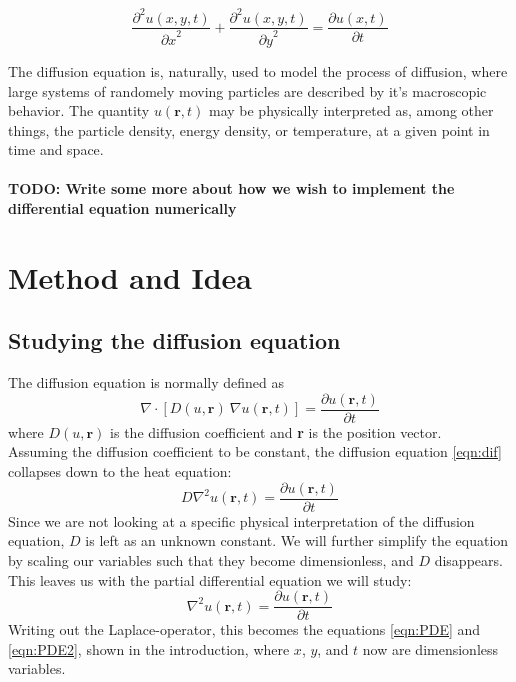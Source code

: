 \documentclass[10pt,a4paper]{article}
\newcommand{\pt}{{\partial t}}
\newcommand{\px}{{\partial x}}
\newcommand{\py}{{\partial y}}
\newcommand{\pu}{{\partial u}}
\newcommand{\ppu}{{\partial^2 u}}
\begin{document}
\begin{equation}\label{eqn:PDE2}
\frac{\ppu(x,y,t)}{\px^2} + \frac{\ppu(x,y,t)}{\py^2} = \frac{\pu(x,t)}{\pt}
\end{equation}


The diffusion equation is, naturally, used to model the process of diffusion, where large systems of randomely moving particles are described by it's macroscopic behavior. The quantity $u(\textbf{r},t)$ may be physically interpreted as, among other things, the particle density, energy density, or temperature, at a given point in time and space.
\\\\
\textbf{TODO: Write some more about how we wish to implement the differential equation numerically}





\section{Method and Idea}

\subsection{Studying the diffusion equation}\label{sec:dif}

The diffusion equation is normally defined as
\begin{equation}\label{eqn:dif}
\nabla \cdot \left[D(u,\textbf{r}) \ \nabla u(\textbf{r},t)\right] = \frac{\pu(\textbf{r},t)}{\pt}
\end{equation}
where $D(u,\textbf{r})$ is the diffusion coefficient and \textbf{r} is the position vector.
\\
Assuming the diffusion coefficient to be constant, the diffusion equation \vref{eqn:dif} collapses down to the heat equation:
\begin{equation}
D \nabla^2 u(\textbf{r},t) = \frac{\pu(\textbf{r},t)}{\pt}
\end{equation}
Since we are not looking at a specific physical interpretation of the diffusion equation, $D$ is left as an unknown constant. We will further simplify the equation by scaling our variables such that they become dimensionless, and $D$ disappears. This leaves us with the partial differential equation we will study:
\begin{equation}
\nabla^2 u(\textbf{r},t) = \frac{\pu(\textbf{r},t)}{\pt}
\end{equation}
Writing out the Laplace-operator, this becomes the equations \ref{eqn:PDE} and \ref{eqn:PDE2}, shown in the introduction, where $x$, $y$, and $t$ now are dimensionless variables.
\end{document}
